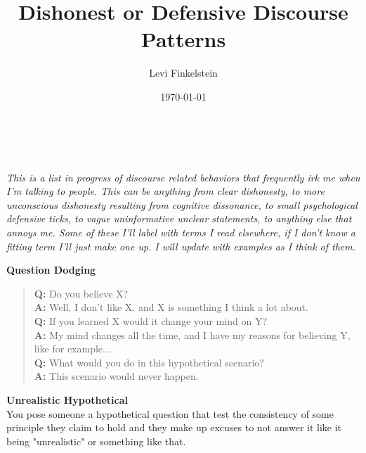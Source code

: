 \documentclass[12pt,english]{article}
\title{Dishonest or Defensive Discourse Patterns}
\author{Levi Finkelstein}
\date{\today}
\begin{document}
\maketitle
\\\\
\it{This is a list in progress of discourse related behaviors that frequently irk me when I'm talking to people. This can be anything from clear dishonesty, to more unconscious dishonesty resulting from cognitive dissonance, to small  psychological defensive ticks, to vague uninformative unclear statements, to anything else that annoys me. Some of these I'll label with terms I read elsewhere, if I don't know a fitting term I'll just make one up. I will update with examples as I think of them.}
\par
\textbf{Question Dodging} 
\begin{quote}
\textbf{Q:} Do you believe X?\\ \textbf{A:} Well, I don't like X, and X is something I think a lot about. \\ \textbf{Q:} If you learned X would it change your mind on Y? \\ \textbf{A:} My mind changes all the time, and I have my reasons for believing Y, like for example...\\ \textbf{Q:} What would you do in this hypothetical scenario?\\ \textbf{A:} This scenario would never happen.\\ 
\end{quote}
\par
\textbf{Unrealistic Hypothetical}\\
You pose someone a hypothetical question that test the consistency of some principle they claim to hold and they make up excuses to not answer it like it being "unrealistic" or something like that.
\end{document}
